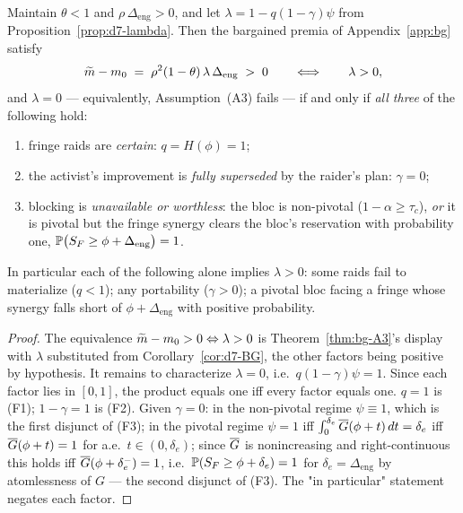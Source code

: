 \begin{theorem}
\label{thm:d7-A3}
Maintain $\theta<1$ and $\rho\,\Delta_{\mathrm{eng}}>0$, and let $\lambda=1-q(1-\gamma)\psi$ from Proposition~\ref{prop:d7-lambda}. Then the bargained premia of Appendix~\ref{app:bg} satisfy
\[
\widetilde{m}-m_{0}\;=\;\rho^{2}(1-\theta)\,\lambda\,\Delta_{\mathrm{eng}}\;>\;0
\qquad\Longleftrightarrow\qquad
\lambda>0,
\]
and $\lambda=0$ --- equivalently, Assumption~\textup{(A3)} fails --- if and only if \emph{all three} of the following hold:
\begin{enumerate}
\item[\textup{(F1)}] fringe raids are \emph{certain}: $q=H(\phi)=1$;
\item[\textup{(F2)}] the activist's improvement is \emph{fully superseded} by the raider's plan: $\gamma=0$;
\item[\textup{(F3)}] blocking is \emph{unavailable or worthless}: the bloc is non-pivotal ($1-\alpha\ge\tau_{c}$), \emph{or} it is pivotal but the fringe synergy clears the bloc's reservation with probability one, $\mathbb{P}\bigl(S_{F}\ge\phi+\Delta_{\mathrm{eng}}\bigr)=1$.
\end{enumerate}
In particular each of the following alone implies $\lambda>0$: some raids fail to materialize ($q<1$); any portability ($\gamma>0$); a pivotal bloc facing a fringe whose synergy falls short of $\phi+\Delta_{\mathrm{eng}}$ with positive probability.
\end{theorem}

\begin{proof}
The equivalence $\widetilde{m}-m_{0}>0\Leftrightarrow\lambda>0$ is Theorem~\ref{thm:bg-A3}'s display with $\lambda$ substituted from Corollary~\ref{cor:d7-BG}, the other factors being positive by hypothesis. It remains to characterize $\lambda=0$, i.e.\ $q(1-\gamma)\psi=1$. Since each factor lies in $[0,1]$, the product equals one iff every factor equals one. $q=1$ is (F1); $1-\gamma=1$ is (F2). Given $\gamma=0$: in the non-pivotal regime $\psi\equiv1$, which is the first disjunct of (F3); in the pivotal regime $\psi=1$ iff $\int_{0}^{\delta_{e}}\overline{G}(\phi+t)\,dt=\delta_{e}$ iff $\overline{G}(\phi+t)=1$ for a.e.\ $t\in(0,\delta_{e})$; since $\overline{G}$ is nonincreasing and right-continuous this holds iff $\overline{G}(\phi+\delta_{e}^{-})=1$, i.e.\ $\mathbb{P}(S_{F}\ge\phi+\delta_{e})=1$ for $\delta_{e}=\Delta_{\mathrm{eng}}$ by atomlessness of $G$ --- the second disjunct of (F3). The "in particular" statement negates each factor.
\end{proof}

